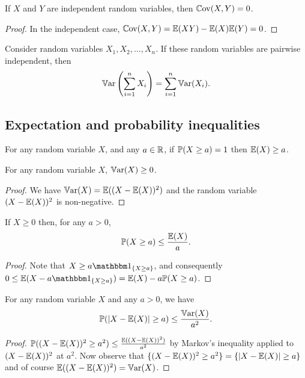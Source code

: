 \documentclass[10pt, a4paper]{article}
\begin{document}
\begin{corollary}
    If $X$ and $Y$ are independent random variables,
    then $\Cov(X, Y) = 0$.
    \begin{proof}
        In the independent case,
        $\Cov(X, Y) = \E(XY) - \E(X)\E(Y) = 0$.
    \end{proof}
\end{corollary}

\begin{corollary}
    Consider random variables $X_1, X_2, \dotsc, X_n$.
    If these random variables are pairwise independent,
    then
    \[
    \Var\left(\sum_{i = 1}^{n}X_i\right) = \sum_{i = 1}^{n}\Var(X_i).
    \]
\end{corollary}

\subsection{Expectation and probability inequalities}
\begin{theorem}\label{pre:prob:thm:monotonicityofexpectation}
    For any random variable $X$,
    and any $a \in \R$,
    if $\P(X \geq a) = 1$ then $\E(X) \geq a$.
\end{theorem}

\begin{corollary}
    For any random variable $X$,
    $\Var(X) \geq 0$.
    \begin{proof}
        We have $\Var(X) = \E((X - \E(X)) ^ 2)$ and the random variable $(X - \E(X)) ^ 2$ is non-negative.
    \end{proof}
\end{corollary}

\begin{corollary}
    If $X \geq 0$ then,
    for any $a > 0$,
    \[
    \P(X \geq a) \leq \frac{\E(X)}{a}.
    \]
    \begin{proof}
        Note that $X \geq a\ind[\{X \geq a\}]$,
        and consequently $0 \leq \E(X - a\ind[\{X \geq a\}]) = \E(X) - a\P(X \geq a)$.
    \end{proof}
\end{corollary}

\begin{corollary}
    For any random variable $X$ and any $a > 0$,
    we have
    \[
    \P(|X - \E(X)| \geq a) \leq \frac{\Var(X)}{a ^ 2}.
    \]
    \begin{proof}
        $\P((X - \E(X)) ^ 2 \geq a ^ 2) \leq \frac{\E((X - \E(X)) ^ 2)}{a ^ 2}$ by Markov's inequality applied to $(X - \E(X)) ^ 2$ at $a ^ 2$.
        Now observe that $\{(X - \E(X)) ^ 2 \geq a ^ 2\} = \{|X - \E(X)| \geq a\}$ and of course $\E((X - \E(X)) ^ 2) = \Var(X)$.
    \end{proof}
\end{corollary}
\end{document}
